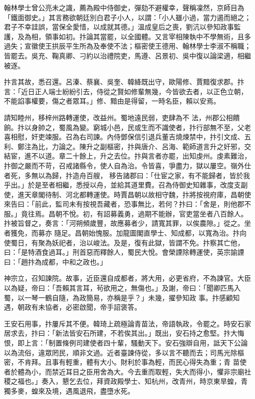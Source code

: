 \begin{pinyinscope}
 翰林學士曾公亮未之識，薦為殿中侍御史，彈劾不避權幸，聲稱凜然，京師目為「鐵面御史。」其言務欲朝廷別白君子小人，以謂：「小人雖小過，當力遏而絕之；君子不幸詿誤，當保全愛惜，以成就其德。」溫成皇后之喪，劉沆以參知政事監護，及為相，領事如初。抃論其當罷，以全國體。又言宰相陳執中不學無術，且多
 過失；宣徽使王拱辰平生所為及奉使不法；樞密使王德用、翰林學士李淑不稱職；皆罷去。吳充、鞠真卿、刁約以治禮院吏，馬遵、呂景初、吳中復以論梁適，相繼被逐。



 抃言其故，悉召還。呂溱、蔡襄、吳奎、韓絳既出守，歐陽修、賈黯復求郡。抃言：「近日正人端士紛紛引去，侍從之賢如修輩無幾，今皆欲去者，以正色立朝，不能諂事權要，傷之者眾耳。」修、黯由是得留，一時名臣，賴以安焉。



 請知睦州，移梓州路轉運使，改益州。蜀地遠民弱，吏肆為不
 法，州郡公相饋餉。抃以身帥之，蜀風為變。窮城小邑，民或生而不識使者，抃行部無不至，父老喜相慰，奸吏竦服。召為右司諫。內侍鄧保信引退兵董吉燒煉禁中，抃引文成、五利、鄭注為比，力論之。陳升之副樞密，抃與唐介、呂海、範師道言升之奸邪，交結宦，進不以道。章二十餘上，升之去位。抃與言者亦罷，出知虔州。虔素難治，抃御之嚴而不苛，召戒諸縣令，使人自為治。令皆喜，爭盡力，獄以屢空。嶺外仕者死，多無以為歸，抃造舟百艘，
 移告諸郡曰：「仕宦之家，有不能歸者，皆於我乎出。」於是至者相繼，悉授以舟，並給其道里費。召為侍御史知雜事，改度支副使，進天章閣待制、河北都轉運使。時賈昌朝以故相守魏，抃將按視府庫，昌朝使來告曰：「前此，監司未有按視吾藏者，恐事無比，若何？抃曰：「舍是，則他郡不服。」竟往焉。昌朝不悅。初，有詔募義勇，過期不能辦，官吏當坐者八百餘人。抃被旨督之，奏言：「河朔頻歲豐，故應募者少，請寬其罪，以俟農隙。」從之。坐者獲免，而募亦
 隨足。昌朝始愧服。加龍圖閣直學士、知成都，以寬為治。抃向使蜀日，有聚為妖祀者，治以峻法。及是，復有此獄，皆謂不免。抃察其亡他，曰：「是特酒食過耳。」刑首惡而釋餘人，蜀民大悅。會榮諲除轉運使，英宗諭諲曰：「趙抃為成都，中和之政也。」



 神宗立，召知諫院。故事，近臣還自成都者，將大用，必更省府，不為諫官。大臣以為疑，帝曰：「吾賴其言耳，茍欲用之，無傷也。」及謝，帝曰：「聞卿匹馬入蜀，以一琴一鶴自隨，為政簡易，亦稱是乎？」未幾，擢參知政
 事。抃感顧知遇，朝政有未協者，必密啟聞，帝手詔褒答。



 王安石用事，抃屢斥其不便。韓琦上疏極論青苗法，帝語執政，令罷之。時安石家居求去，抃曰：「新法皆安石所建，不若俟其出。」既出，安石持之愈堅。抃大悔恨，即上言：「制置條例司建使者四十輩，騷動天下。安石強辯自用，詆天下公論以為流俗，違眾罔民，順非文過。近者臺諫侍從，多以言不聽而去；司馬光除樞密，不肯拜。且事有輕重，體有大小。財利於事為輕，而民心得失為重；青
 苗使者於體為小，而禁近耳目之臣用舍為大。今去重而取輕，失大而得小，懼非宗廟社稷之福也。」奏入，懇乞去位，拜資政殿學士、知杭州，改青州，時京東旱蝗，青獨多麥，蝗來及境，遇風退飛，盡墮水死。




\end{pinyinscope}
